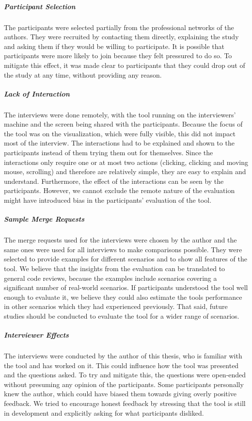 \documentclass[a4paper,11pt,twoside]{article}
\theoremstyle{definition} %
\begin{document}
\subparagraph{Participant Selection}
The participants were selected partially from the professional networks of the authors. They were recruited by contacting them directly, explaining the study and asking them if they would be willing to participate. It is possible that participants were more likely to join because they felt pressured to do so. To mitigate this effect, it was made clear to participants that they could drop out of the study at any time, without providing any reason.

\subparagraph{Lack of Interaction}
The interviews were done remotely, with the tool running on the interviewers’ machine and the screen being shared with the participants. Because the focus of the tool was on the visualization, which were fully visible, this did not impact most of the interview. The interactions had to be explained and shown to the participants instead of them trying them out for themselves. Since the interactions only require one or at most two actions (clicking, clicking and moving mouse, scrolling) and therefore are relatively simple, they are easy to explain and understand. Furthermore, the effect of the interactions can be seen by the participants. However, we cannot exclude the remote nature of the evaluation might have introduced bias in the participants’ evaluation of the tool.

\subparagraph{Sample Merge Requests}
The merge requests used for the interviews were chosen by the author and the same ones were used for all interviews to make comparisons possible. They were selected to provide examples for different scenarios and to show all features of the tool. We believe that the insights from the evaluation can be translated to general code reviews, because the examples include scenarios covering a significant number of real-world scenarios. If participants understood the tool well enough to evaluate it, we believe they could also estimate the tools performance in other scenarios which they had experienced previously. That said, future studies should be conducted to evaluate the tool for a wider range of scenarios.

\subparagraph{Interviewer Effects}
The interviews were conducted by the author of this thesis, who is familiar with the tool and has worked on it. This could influence how the tool was presented and the questions asked. To try and mitigate this, the questions were open-ended without presuming any opinion of the participants. Some participants personally knew the author, which could have biased them towards giving overly positive feedback. We tried to encourage honest feedback by stressing that the tool is still in development and explicitly asking for what participants disliked.
\end{document}
